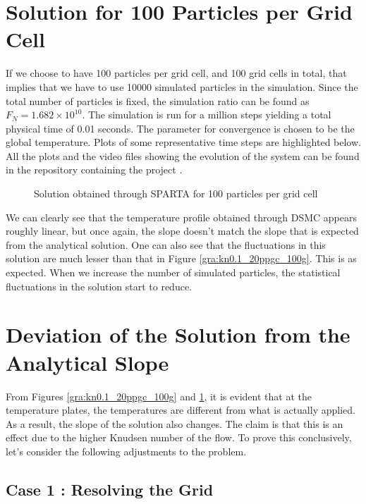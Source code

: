 \section{Solution for 100 Particles per Grid Cell}

If we choose to have 100 particles per grid cell, and 100 grid cells in total, that implies that we have to use 10000 simulated particles in the simulation. Since the total number of particles is fixed, the simulation ratio can be found as $F_N = 1.682 \times 10^{10} $. The simulation is run for a million steps yielding a total physical time of 0.01 seconds. The parameter for convergence is chosen to be the global temperature. Plots of some representative time steps are highlighted below. All the plots and the video files showing the evolution of the system can be found in the repository containing the project \cite{Raghuveeran_Work_During_Summer_2024}.

\begin{figure}[H]
	\centering
    
    \caption{Solution obtained through SPARTA for 100 particles per grid cell}
	\label{gra:kn0.1_100ppgc_100g}
\end{figure}

\no We can clearly see that the temperature profile obtained through DSMC appears roughly linear, but once again, the slope doesn't match the slope that is expected from the analytical solution. One can also see that the fluctuations in this solution are much lesser than that in Figure \ref{gra:kn0.1_20ppgc_100g}. This is as expected. When we increase the number of simulated particles, the statistical fluctuations in the solution start to reduce.

\section{Deviation of the Solution from the Analytical Slope}

From Figures \ref{gra:kn0.1_20ppgc_100g} and \ref{gra:kn0.1_100ppgc_100g}, it is evident that at the temperature plates, the temperatures are different from what is actually applied. As a result, the slope of the solution also changes. The claim is that this is an effect due to the higher Knudsen number of the flow. To prove this conclusively, let's consider the following adjustments to the problem.

\subsection{Case 1 : Resolving the Grid}

